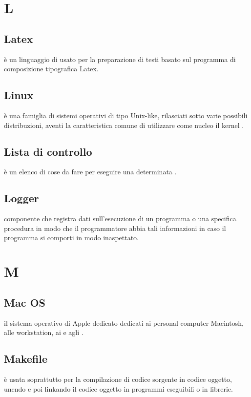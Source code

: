 \documentclass[12pt,a4paper]{article}
\begin{document}
\newpage

\section{L}


\subsection{Latex} 
 è un linguaggio di  usato per la preparazione di testi basato sul programma di composizione tipografica Latex.

\subsection{Linux} 
 è una famiglia di sistemi operativi  di tipo Unix-like, rilasciati sotto varie possibili distribuzioni, aventi la caratteristica comune di utilizzare come nucleo il kernel .

\subsection{Lista di controllo} 
 è un elenco di cose da fare per eseguire una determinata .

\subsection{Logger} 
componente che registra dati sull'esecuzione di un programma o una specifica procedura in modo che il programmatore abbia tali informazioni in caso il programma si comporti in modo inaspettato.


\newpage

\section{M}


\subsection{Mac OS} 
 il sistema operativo di Apple dedicato dedicati ai personal computer Macintosh, alle workstation, ai  e agli .

\subsection{Makefile} 
 è usata soprattutto per la compilazione di codice sorgente in codice oggetto, unendo e poi linkando il codice oggetto in programmi eseguibili o in librerie.
\end{document}
